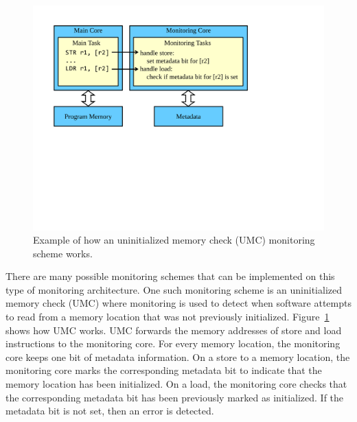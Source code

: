 \begin{figure}
  \begin{center}
    \includegraphics[width=\columnwidth]{figs/monitoring_wcet/umc_example.pdf}
    \vspace{-0.1in}
    \caption{Example of how an uninitialized memory check (UMC) monitoring
    scheme works.}
    \label{fig:monitoring.umc_example}
    \vspace{-0.2in}
  \end{center}
\end{figure}

There are many possible monitoring schemes that can be implemented on this
type of monitoring architecture. One such monitoring scheme is an
uninitialized memory check (UMC) where 
monitoring is used to detect when software attempts to read from a memory location that
was not previously initialized. Figure~\ref{fig:monitoring.umc_example} shows how UMC works. 
UMC forwards the memory addresses
of store and load instructions to the monitoring core. For every memory location,
the monitoring core keeps one bit of metadata information. On a store to a
memory location, the monitoring core marks the corresponding metadata bit to
indicate that the memory location has been initialized. On a load, the monitoring core checks that the corresponding metadata bit has
been previously marked as initialized. If the metadata bit is not set, then an
error is detected.

